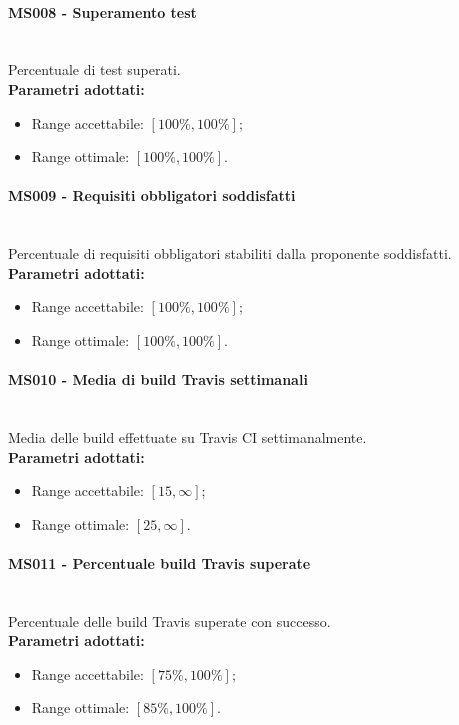 \paragraph{MS008 - Superamento test}\mbox{}\\[0,3cm]
Percentuale di test superati. \\[0,2cm]
\textbf{Parametri adottati:}
\begin{itemize}
	\item Range accettabile: $[100\%,100\%]$;
	\item Range ottimale: $[100\%,100\%]$.
\end{itemize}

\paragraph{MS009 - Requisiti obbligatori soddisfatti}\mbox{}\\[0,3cm]
Percentuale di requisiti obbligatori stabiliti dalla proponente soddisfatti.\\[0,2cm]
\textbf{Parametri adottati:}
\begin{itemize}
	\item Range accettabile: $[100\%,100\%]$;
	\item Range ottimale: $[100\%,100\%]$.
\end{itemize}
	
\paragraph{MS010 - Media di build Travis settimanali}\mbox{}\\[0,3cm]
Media delle build effettuate su Travis CI settimanalmente.\\[0,2cm]
\textbf{Parametri adottati:}
\begin{itemize}
	\item Range accettabile: $[15,\infty]$;
	\item Range ottimale: $[25,\infty]$.
\end{itemize}

\paragraph{MS011 - Percentuale build Travis superate}\mbox{}\\[0,3cm]
Percentuale delle build Travis superate con successo.\\[0,2cm]
\textbf{Parametri adottati:}
\begin{itemize}
	\item Range accettabile: $[75\%,100\%]$;
	\item Range ottimale: $[85\%,100\%]$.
\end{itemize}